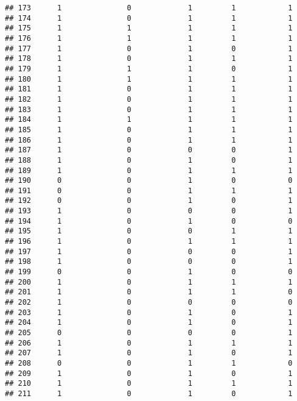 \documentclass[]{article}
\begin{document}
\begin{verbatim}
## 173      1               0             1         1            1
## 174      1               0             1         1            1
## 175      1               1             1         1            1
## 176      1               1             1         1            1
## 177      1               0             1         0            1
## 178      1               0             1         1            1
## 179      1               1             1         0            1
## 180      1               1             1         1            1
## 181      1               0             1         1            1
## 182      1               0             1         1            1
## 183      1               0             1         1            1
## 184      1               1             1         1            1
## 185      1               0             1         1            1
## 186      1               0             1         1            1
## 187      1               0             0         0            1
## 188      1               0             1         0            1
## 189      1               0             1         1            1
## 190      0               0             1         0            0
## 191      0               0             1         1            1
## 192      0               0             1         0            1
## 193      1               0             0         0            1
## 194      1               0             1         0            0
## 195      1               0             0         1            1
## 196      1               0             1         1            1
## 197      1               0             0         0            1
## 198      1               0             0         0            1
## 199      0               0             1         0            0
## 200      1               0             1         1            1
## 201      1               0             1         1            0
## 202      1               0             0         0            0
## 203      1               0             1         0            1
## 204      1               0             1         0            1
## 205      0               0             0         0            1
## 206      1               0             1         1            1
## 207      1               0             1         0            1
## 208      0               0             1         1            0
## 209      1               0             1         0            1
## 210      1               0             1         1            1
## 211      1               0             1         0            1

\end{verbatim}
\end{document}
